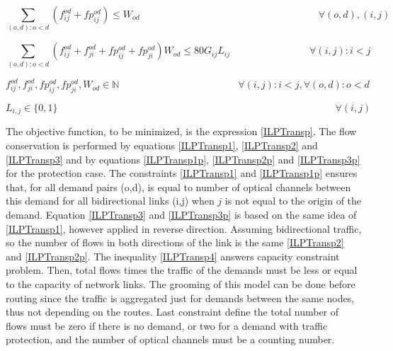 \begin{equation}
\sum_{(o,d):o<d} \left(f_{ij}^{od}  + fp_{ij}^{od}\right) \leq W_{od}  \qquad \qquad \qquad \qquad \qquad \qquad \qquad \qquad \qquad
\forall (o,d), (i,j)
\label{ILPTransp4p}
\end{equation}

\begin{equation}
\sum_{(o,d):o<d} \left(f_{ij}^{od} + f_{ji}^{od} + fp_{ij}^{od} + fp_{ji}^{od}\right) W_{od} \leq 80 G_{ij} L_{ij} \qquad \qquad \qquad \qquad
\forall(i,j) : i < j
\label{ILPTransp4}
\end{equation}

\begin{equation}
f_{ij}^{od} , f_{ji}^{od} , fp_{ij}^{od} , fp_{ji}^{od} , W_{od} \in \mathbb{N}   \qquad \qquad \qquad \qquad \qquad \qquad
\forall(i,j) : i < j, \forall(o,d) : o < d
\label{ILPTransp5}
\end{equation}

\begin{equation}
L_{i,j} \in \{0,1\} \qquad \qquad \qquad \qquad \qquad \qquad \qquad \qquad \qquad \qquad \qquad \qquad \qquad \qquad
\forall(i,j)
\label{ILPTranspL1}
\end{equation}

\vspace{10pt}

The objective function, to be minimized, is the expression \ref{ILPTransp}. The flow conservation is performed by equations \ref{ILPTransp1}, \ref{ILPTransp2} and \ref{ILPTransp3} and by equations \ref{ILPTransp1p}, \ref{ILPTransp2p} and \ref{ILPTransp3p} for the protection case. The constraints \ref{ILPTransp1} and \ref{ILPTransp1p} ensures that, for all demand pairs (o,d), is equal to number of optical channels between this demand for all bidirectional links (i,j) when $j$ is not equal to the origin of the demand. Equation \ref{ILPTransp3} and \ref{ILPTransp3p} is based on the same idea of \ref{ILPTransp1}, however applied in reverse direction. Assuming bidirectional traffic, so the number of flows in both directions of the link is the same \ref{ILPTransp2} and \ref{ILPTransp2p}. The inequality \ref{ILPTransp4} answers capacity constraint problem. Then, total flows times the traffic of the demands must be less or equal to the capacity of network links. The grooming of this model can be done before routing since the traffic is aggregated just for demands between the same nodes, thus not depending on the routes. Last constraint define the total number of flows must be zero if there is no demand, or two for a demand with traffic protection, and the number of optical channels must be a counting number.\\

